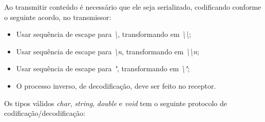 \documentclass[11pt]{article}
\begin{document}
Ao transmitir conteúdo é necessário que ele seja serializado, codificando
conforme o seguinte acordo, no transmissor:

\begin{itemize}
\item

    Usar sequência de escape para \textit{\textbackslash{}}, transformando em
    \textit{\textbackslash{}\textbackslash{}};

\item

    Usar sequência de escape para \textit{\textbackslash{}n}, transformando em
    \textit{\textbackslash{}\textbackslash{}n};

\item

    Usar sequência de escape para \textit{"}, transformando em
    \textit{\textbackslash{}"};

\item

    O processo inverso, de decodificação, deve ser feito no receptor.

\end{itemize}

Os tipos válidos \textit{char}, \textit{string}, \textit{double} e
\textit{void} tem o seguinte protocolo de codificação/decodificação:
\end{document}
